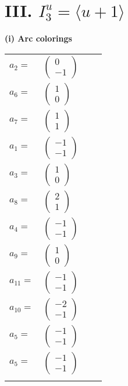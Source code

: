 \documentclass[1p]{elsarticle_modified}
\theoremstyle{definition}
\begin{document}
\centering \section*{III. $I^u_{3}= \langle u+1 \rangle$}
\flushleft \textbf{(i) Arc colorings}\\
\begin{tabular}{m{7pt} m{180pt} m{7pt} m{180pt} }
\flushright $a_{2}=$&$\begin{pmatrix}0\\-1\end{pmatrix}$ \\
\flushright $a_{6}=$&$\begin{pmatrix}1\\0\end{pmatrix}$ \\
\flushright $a_{7}=$&$\begin{pmatrix}1\\1\end{pmatrix}$ \\
\flushright $a_{1}=$&$\begin{pmatrix}-1\\-1\end{pmatrix}$ \\
\flushright $a_{3}=$&$\begin{pmatrix}1\\0\end{pmatrix}$ \\
\flushright $a_{8}=$&$\begin{pmatrix}2\\1\end{pmatrix}$ \\
\flushright $a_{4}=$&$\begin{pmatrix}-1\\-1\end{pmatrix}$ \\
\flushright $a_{9}=$&$\begin{pmatrix}1\\0\end{pmatrix}$ \\
\flushright $a_{11}=$&$\begin{pmatrix}-1\\-1\end{pmatrix}$ \\
\flushright $a_{10}=$&$\begin{pmatrix}-2\\-1\end{pmatrix}$ \\
\flushright $a_{5}=$&$\begin{pmatrix}-1\\-1\end{pmatrix}$\\ \flushright $a_{5}=$&$\begin{pmatrix}-1\\-1\end{pmatrix}$\\&\end{tabular}
\end{document}
